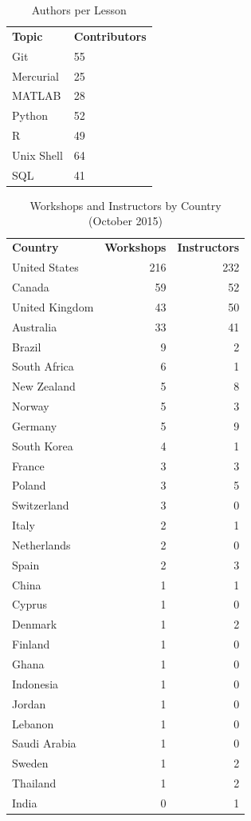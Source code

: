 \documentclass[10pt,a4paper,twocolumn]{article}
\begin{document}
\begin{table}[h]
\begin{tabular}{ll}
\textbf{Topic} & \textbf{Contributors} \\
Git & 55 \\
Mercurial & 25 \\
MATLAB & 28 \\
Python & 52 \\
R & 49 \\
Unix Shell & 64 \\
SQL & 41
\end{tabular}
\caption{Authors per Lesson}
\label{t:authors-per-lesson}
\end{table}

\begin{table}[h]
\begin{tabular}{lrr}
\textbf{Country} & \textbf{Workshops} & \textbf{Instructors} \\
United States & 216 & 232 \\
Canada & 59 & 52 \\
United Kingdom & 43 & 50 \\
Australia & 33 & 41 \\
Brazil & 9 & 2 \\
South Africa & 6 & 1 \\
New Zealand & 5 & 8 \\
Norway & 5 & 3 \\
Germany & 5 & 9 \\
South Korea & 4 & 1 \\
France & 3 & 3 \\
Poland & 3 & 5 \\
Switzerland & 3 & 0 \\
Italy & 2 & 1 \\
Netherlands & 2 & 0 \\
Spain & 2 & 3 \\
China & 1 & 1 \\
Cyprus & 1 & 0 \\
Denmark & 1 & 2 \\
Finland & 1 & 0 \\
Ghana & 1 & 0 \\
Indonesia & 1 & 0 \\
Jordan & 1 & 0 \\
Lebanon & 1 & 0 \\
Saudi Arabia & 1 & 0 \\
Sweden & 1 & 2 \\
Thailand & 1 & 2 \\
India & 0 & 1 \\
\end{tabular}
\caption{Workshops and Instructors by Country (October 2015)}
\label{t:by-country}
\end{table}

\clearpage

\nocite{*}
{\small
}
\end{document}
